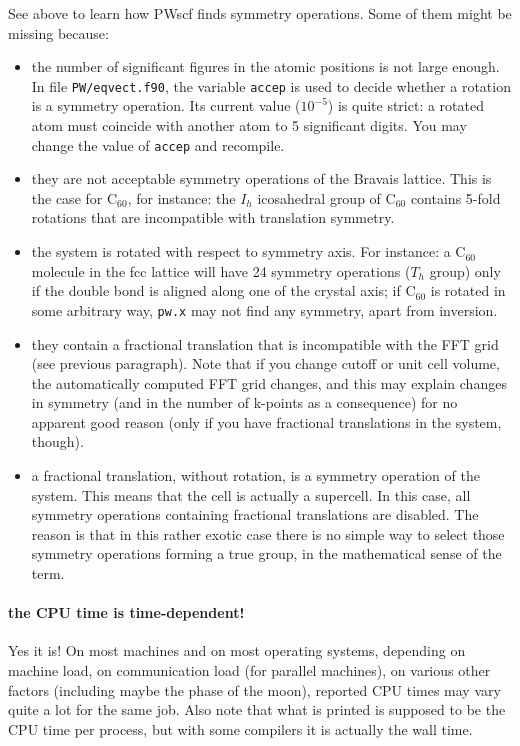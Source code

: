 \documentclass[12pt,a4paper]{article}
\begin{document}
See above to learn how PWscf finds symmetry operations.
Some of them might be missing because:
\begin{itemize}
  \item
    the number of significant figures in the atomic positions is not
    large enough.
    In file \texttt{PW/eqvect.f90}, the variable \texttt{accep} is
    used to decide whether a rotation is a symmetry operation.
    Its current value ($10^{-5}$) is quite strict: a rotated atom must
    coincide with another atom to 5 significant digits.
    You may change the value of \texttt{accep} and recompile.
  \item
    they are not acceptable symmetry operations of the Bravais
    lattice.
    This is the case for C$_{60}$, for instance: the $I_h$ icosahedral
    group of C$_{60}$ contains 5-fold rotations that are incompatible
    with translation symmetry.
  \item
    the system is rotated with respect to symmetry axis.
    For instance: a C$_{60}$ molecule in the fcc lattice will have 24
    symmetry operations ($T_h$ group) only if the double bond is
    aligned along one of the crystal axis; if C$_{60}$ is rotated in
    some arbitrary way, \texttt{pw.x} may not find any symmetry, apart
    from inversion.
  \item
    they contain a fractional translation that is incompatible with
    the FFT grid (see previous paragraph).
    Note that if you change cutoff or unit cell volume, the
    automatically computed FFT grid changes, and this may explain
    changes in symmetry (and in the number of k-points as a
    consequence) for no apparent good reason (only if you have
    fractional translations in the system, though).
  \item
    a fractional translation, without rotation, is a symmetry
    operation of the system. This means that the cell is actually 
    a supercell. In this case, all symmetry operations containing 
    fractional translations are disabled.
    The reason is that in this rather exotic case there is no simple
    way to select those symmetry operations forming a true group, in
    the mathematical sense of the term.
\end{itemize}

\paragraph{the CPU time is time-dependent!}

Yes it is!
On most machines and on most operating systems, depending on machine
load, on communication load (for parallel machines), on various other
factors (including maybe the phase of the moon), reported CPU times
may vary quite a lot for the same job.
Also note that what is printed is supposed to be the CPU time per
process, but with some compilers it is actually the wall time.
\end{document}
